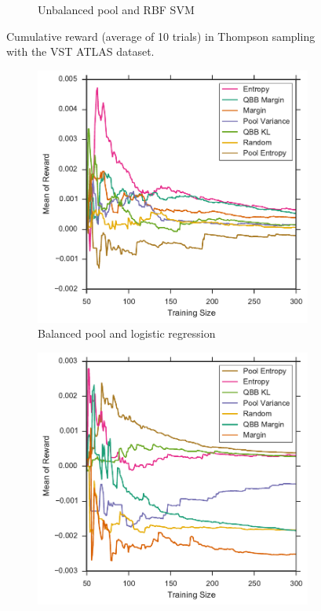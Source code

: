 \begin{figure}[p]
\begin{subfigure}{.5\textwidth}
		\caption{Unbalanced pool and RBF SVM}
		\label{fig:vstatlas_ur_sum_rewards}
	\end{subfigure}
	\caption[Cumulative reward of heuristics (VST ATLAS)]{
		Cumulative reward (average of 10 trials) in Thompson sampling with the VST ATLAS dataset.}
	\label{fig:vstatlas_sum_rewards}
\end{figure}


\begin{figure}[p]
	\centering
	\begin{subfigure}{.5\textwidth}
		\centering
		\includegraphics[width=\textwidth]{figures/5_thompson/vstatlas_bl_avg_rewards}
		\caption{Balanced pool and logistic regression}
		\label{fig:vstatlas_bl_avg_rewards}
	\end{subfigure}%
	\begin{subfigure}{.5\textwidth}
		\centering
		\includegraphics[width=\linewidth]{figures/5_thompson/vstatlas_br_avg_rewards}

\end{subfigure}
\end{figure}
